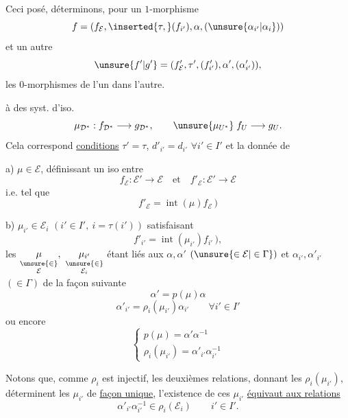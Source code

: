 Ceci posé, déterminons, pour un $1$-morphisme
\[
f=(f_{\mathcal E},\inserted{\tau,}(f_{i'}),\alpha,(\unsure{\alpha_{i'}|\alpha_i}))
\]
et un autre
\[
\unsure{f'|g'}=(f'_{\mathcal E},\tau',(f'_{i'}),\alpha',(\alpha'_{i'})),
\]
les $0$-morphismes de l'un dans l'autre.

 à des syst. d'iso.
\[
\mu_{\mathcal D^*}:f_{\mathcal D^*}\longrightarrow g_{\mathcal D^*},\qquad
\unsure{\mu_{U^*}}\;f_U\longrightarrow g_U.
\]
Cela correspond \uline{conditions} $\tau'=\tau$, $d'_{i'}=d_{i'}$ $\forall i'\in I'$ et la donnée de

a) $\boxed{\boxed{\mu\in\mathcal E}}$, définissant un iso entre
\[
f_{\mathcal E}:\mathcal E'\longrightarrow\mathcal E
\quad\text{et}\quad
f'_{\mathcal E}:\mathcal E'\longrightarrow\mathcal E
\]
i.e.  tel que
\[
\boxed{f'_{\mathcal E}=\operatorname{int}(\mu)f_{\mathcal E}}\,)
\]

b) $\boxed{\boxed{\mu_{i'}\in\mathcal E_i}}$ $(i'\in I',\ i=\tau(i'))$
satisfaisant
\[
\boxed{f'_{i'}=\operatorname{int}(\mu_{i'})f_{i'}}\,),
\]
les $\underset{\substack{\unsure{\in}\\\mathcal E}}{\mu},\ \underset{\substack{\unsure{\in}\\\mathcal E_i}}{\mu_{i'}}$ étant liés aux $\alpha,\alpha'$  $(\unsure{\in\mathcal E|\in\Gamma})$
et $\alpha_{i'},\alpha'_{i'}$ $(\in\Gamma)$ de la façon suivante
\[
\boxed{\alpha'=p(\mu)\alpha}
\]
\[
\boxed{\alpha'_{i'}=\rho_i(\mu_{i'})\alpha_{i'}}\qquad\forall i'\in I'
\]
ou encore
\[
\boxed{\begin{cases}
p(\mu)=\alpha'\alpha^{-1}\\
\rho_i(\mu_{i'})=\alpha'_{i'}\alpha_{i'}^{-1}
\end{cases}}
\]

Notons que, comme $\rho_i$ est injectif, les deuxièmes relations, donnant les $\rho_i(\mu_{i'})$, déterminent les $\mu_{i'}$ de \uline{façon unique}, l'existence de ces $\mu_{i'}$ \uline{équivaut aux relations}
\[
\boxed{\alpha'_{i'}\alpha_{i'}^{-1}\in\rho_i(\mathcal E_i)}\qquad i'\in I'.
\]

